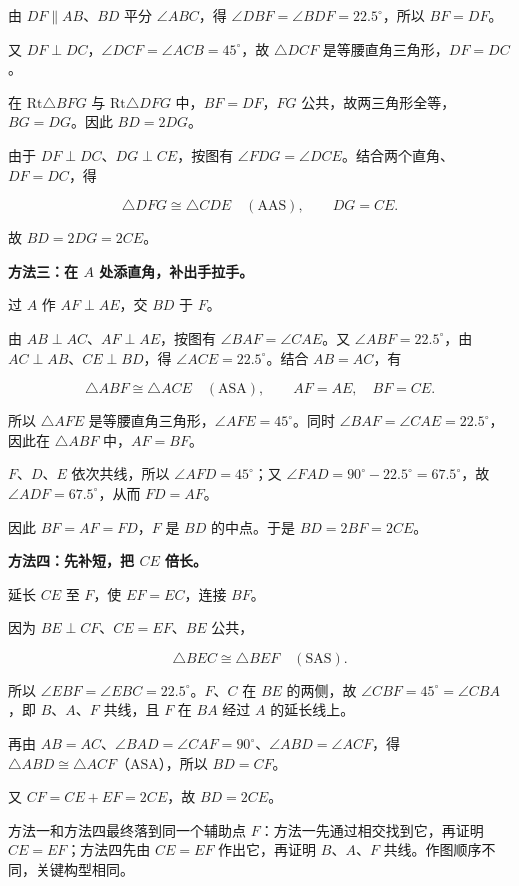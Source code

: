 由 $DF\parallel AB$、$BD$ 平分 $\angle ABC$，得 $\angle DBF=\angle BDF=22.5^\circ$，所以 $BF=DF$。

又 $DF\perp DC$，$\angle DCF=\angle ACB=45^\circ$，故 $\triangle DCF$ 是等腰直角三角形，$DF=DC$。

在 $\mathrm{Rt}\triangle BFG$ 与 $\mathrm{Rt}\triangle DFG$ 中，$BF=DF$，$FG$ 公共，故两三角形全等，$BG=DG$。因此 $BD=2$$DG$。

由于 $DF\perp DC$、$DG\perp CE$，按图有 $\angle FDG=\angle DCE$。结合两个直角、$DF=DC$，得

\[
\triangle DFG\cong\triangle CDE\quad(\mathrm{AAS}),
\qquad DG=CE.
\]

故 $BD=2$$DG=2$$CE$。

\textbf{方法三：在 $A$ 处添直角，补出手拉手。}

过 $A$ 作 $AF\perp AE$，交 $BD$ 于 $F$。

\esdiagram{\esdiExampleHand}

由 $AB\perp AC$、$AF\perp AE$，按图有 $\angle BAF=\angle CAE$。又 $\angle ABF=22.5^\circ$，由 $AC\perp AB$、$CE\perp BD$，得 $\angle ACE=22.5^\circ$。结合 $AB=AC$，有

\[
\triangle ABF\cong\triangle ACE\quad(\mathrm{ASA}),
\qquad AF=AE,\quad BF=CE.
\]

所以 $\triangle AFE$ 是等腰直角三角形，$\angle AFE=45^\circ$。同时 $\angle BAF=\angle CAE=22.5^\circ$，因此在 $\triangle ABF$ 中，$AF=BF$。

$F$、$D$、$E$ 依次共线，所以 $\angle AFD=45^\circ$；又 $\angle FAD=90^\circ-22.5^\circ=67.5^\circ$，故 $\angle ADF=67.5^\circ$，从而 $FD=AF$。

因此 $BF=AF=FD$，$F$ 是 $BD$ 的中点。于是 $BD=2$$BF=2$$CE$。

\textbf{方法四：先补短，把 $CE$ 倍长。}

延长 $CE$ 至 $F$，使 $EF=EC$，连接 $BF$。

\esdiagram{\esdiExampleReflect}

因为 $BE\perp CF$、$CE=EF$、$BE$ 公共，

\[
\triangle BEC\cong\triangle BEF\quad(\mathrm{SAS}).
\]

所以 $\angle EBF=\angle EBC=22.5^\circ$。$F$、$C$ 在 $BE$ 的两侧，故 $\angle CBF=45^\circ=\angle CBA$，即 $B$、$A$、$F$ 共线，且 $F$ 在 $BA$ 经过 $A$ 的延长线上。

再由 $AB=AC$、$\angle BAD=\angle CAF=90^\circ$、$\angle ABD=\angle ACF$，得 $\triangle ABD\cong \triangle ACF$（$\mathrm{ASA}$），所以 $BD=CF$。

又 $CF=CE+EF=2$$CE$，故 $BD=2$$CE$。

方法一和方法四最终落到同一个辅助点 $F$：方法一先通过相交找到它，再证明 $CE=EF$；方法四先由 $CE=EF$ 作出它，再证明 $B$、$A$、$F$ 共线。作图顺序不同，关键构型相同。

